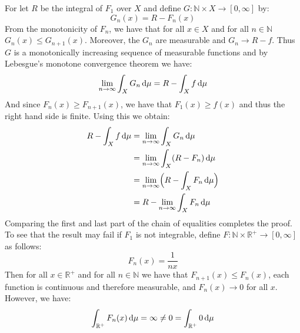 \documentclass[crop=false,class=article]{standalone}                           %
\begin{document}
        \begin{solution}
            For let $R$ be the integral of $F_{1}$ over $X$ and define
            $G:\mathbb{N}\times{X}\rightarrow[0,\infty]$ by:
            \begin{equation}
                G_{n}(x)=R-F_{n}(x)
            \end{equation}
            From the monotonicity of $F_{n}$, we have that for all $x\in{X}$ and
            for all $n\in\mathbb{N}$ $G_{n}(x)\leq{G}_{n+1}(x)$. Moreover, the
            $G_{n}$ are measurable and $G_{n}\rightarrow{R}-f$. Thus $G$ is a
            monotonically increasing sequence of measurable functions and by
            Lebesgue's monotone convergence theorem we have:
            \begin{equation}
                \underset{n\rightarrow\infty}{\lim}\int_{X}G_{n}\mathop{}\!\mathrm{d}{\mu}
                =R-\int_{X}f\mathop{}\!\mathrm{d}{\mu}
            \end{equation}
            And since $F_{n}(x)\geq{F}_{n+1}(x)$, we have that
            $F_{1}(x)\geq{f}(x)$ and thus the right hand side is finite. Using
            this we obtain:
            \begin{align}
                R-\int_{X}f\mathop{}\!\mathrm{d}{\mu}
                &=\underset{n\rightarrow\infty}{\lim}\int_{X}G_{n}\mathop{}\!\mathrm{d}{\mu}\\
                &=\underset{n\rightarrow\infty}{\lim}
                    \int_{X}(R-F_{n})\mathop{}\!\mathrm{d}{\mu}\\
                &=\underset{n\rightarrow\infty}{\lim}
                    \Big(R-\int_{X}F_{n}\mathop{}\!\mathrm{d}{\mu}\Big)\\
                &=R-\underset{n\rightarrow\infty}{\lim}\int_{X}F_{n}\mathop{}\!\mathrm{d}{\mu}
            \end{align}
            Comparing the first and last part of the chain of equalities
            completes the proof. To see that the result may fail if $F_{1}$ is
            not integrable, define
            $F:\mathbb{N}\times\mathbb{R}^{+}\rightarrow[0,\infty]$ as follows:
            \begin{equation}
                F_{n}(x)=\frac{1}{nx}
            \end{equation}
            Then for all $x\in\mathbb{R}^{+}$ and for all $n\in\mathbb{N}$ we
            have that $F_{n+1}(x)\leq{F}_{n}(x)$, each function is continuous
            and therefore measurable, and $F_{n}(x)\rightarrow{0}$ for all $x$.
            However, we have:
            \begin{equation}
                \int_{\mathbb{R}^{+}}F_{n}(x)\mathop{}\!\mathrm{d}{\mu}
                =\infty\ne{0}
                =\int_{\mathbb{R}^{+}}0\mathop{}\!\mathrm{d}{\mu}
            \end{equation}
        \end{solution}
\end{document}
